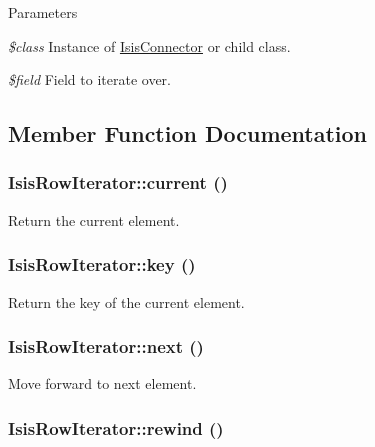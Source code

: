\begin{DoxyParams}{Parameters}
\item[{\em \$class}]Instance of \hyperlink{classIsisConnector}{IsisConnector} or child class.\item[{\em \$field}]Field to iterate over. \end{DoxyParams}


\subsection{Member Function Documentation}
\hypertarget{classIsisRowIterator_abe18cfd484f70348fb5832444186b10d}{
\subsubsection[{current}]{\setlength{\rightskip}{0pt plus 5cm}IsisRowIterator::current ()}}
\label{classIsisRowIterator_abe18cfd484f70348fb5832444186b10d}
Return the current element. \hypertarget{classIsisRowIterator_a96f65bca7f2e048a449e6f316d802e6f}{
\subsubsection[{key}]{\setlength{\rightskip}{0pt plus 5cm}IsisRowIterator::key ()}}
\label{classIsisRowIterator_a96f65bca7f2e048a449e6f316d802e6f}
Return the key of the current element. \hypertarget{classIsisRowIterator_ad084ce947a265969f738e7d7dc8a1853}{
\subsubsection[{next}]{\setlength{\rightskip}{0pt plus 5cm}IsisRowIterator::next ()}}
\label{classIsisRowIterator_ad084ce947a265969f738e7d7dc8a1853}
Move forward to next element. \hypertarget{classIsisRowIterator_a5ef72f942cc738bf24cf251018c28edf}{
\subsubsection[{rewind}]{\setlength{\rightskip}{0pt plus 5cm}IsisRowIterator::rewind ()}}
\label{classIsisRowIterator_a5ef72f942cc738bf24cf251018c28edf}
